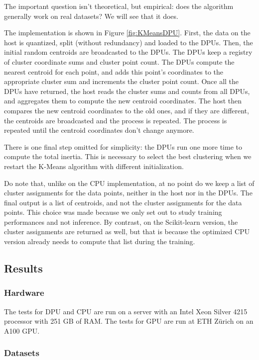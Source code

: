 The important question isn't theoretical, but empirical: does the algorithm generally work on real datasets? We will see that it does.

The implementation is shown in Figure \ref{fig:KMeansDPU}. First, the data on the host is quantized, split (without redundancy) and loaded to the DPUs. Then, the initial random centroids are broadcasted to the DPUs. The DPUs keep a registry of cluster coordinate sums and cluster point count. The DPUs compute the nearest centroid for each point, and adds this point's coordinates to the appropriate cluster sum and increments the cluster point count. Once all the DPUs have returned, the host reads the cluster sums and counts from all DPUs, and aggregates them to compute the new centroid coordinates. The host then compares the new centroid coordinates to the old ones, and if they are different, the centroids are broadcasted and the process is repeated. The process is repeated until the centroid coordinates don't change anymore.

There is one final step omitted for simplicity: the DPUs run one more time to compute the total inertia. This is necessary to select the best clustering when we restart the K-Means algorithm with different initialization.

Do note that, unlike on the CPU implementation, at no point do we keep a list of cluster assignments for the data points, neither in the host nor in the DPUs. The final output is a list of centroids, and not the cluster assignments for the data points. This choice was made because we only set out to study training performances and not inference. By contrast, on the Scikit-learn version, the cluster assignments are returned as well, but that is because the optimized CPU version already needs to compute that list during the training.

\subsection{Results}

\subsubsection{Hardware}

The tests for DPU and CPU are run on a server with an Intel Xeon Silver 4215 processor with 251 GB of RAM. The tests for GPU are run at ETH Zürich on an A100 GPU.

\subsubsection{Datasets}

